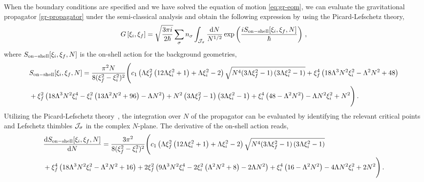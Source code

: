 \documentclass[superscriptaddress,aps,preprintnumbers,nofootinbib]{revtex4-2}
\begin{document}
When the boundary conditions are specified and we have solved the equation of motion \eqref{eq:gr-eom}, we can evaluate the gravitational propagator \eqref{gr-propagator} under the semi-classical analysis and obtain the following expression by using the Picard-Lefschetz theory, 
\begin{align}\label{G-Path-integral-gr}
G\left[\xi_{i},\xi_{f}\right]  
= \sqrt{\frac{3\pi i}{2\hbar}}\sum_\sigma n_\sigma \int_{\cal J_\sigma} \frac{\mathrm{d} N}{N^{1/2}} 
\exp \left(\frac{iS_{\rm on-shell}[\xi_{i},\xi_{f}, N]}{\hbar}\right)\,,  
\end{align}
where $S_{\rm on-shell}[\xi_{i},\xi_{f}, N]$ 
is the on-shell action for the background geometries,
\begin{align}\label{eq:on-shell-gr}
\begin{split}
&S_{\rm on-shell}[\xi_{i},\xi_{f},N]=\frac{\pi ^2 N}{8(\xi _f^2-\xi _i^2)^2}
\Biggl(c_1 \left(\Lambda  \xi _f^2 \left(12 \Lambda  \xi _i^2+1\right)+\Lambda  \xi _i^2-2\right) \sqrt{N^4(3 \Lambda  \xi _f^2-1) \left(3 \Lambda  \xi _i^2-1\right)}+\xi _f^4 \left(18 \Lambda ^3 N^2 \xi _i^2-\Lambda ^2 N^2+48\right)\\
&+\xi _f^2 \left(18 \Lambda ^3 N^2 \xi _i^4-\xi _i^2 \left(13 \Lambda ^2 N^2+96\right)-\Lambda  N^2\right)+N^2 \left(3 \Lambda  \xi _f^2-1\right) \left(3 \Lambda  \xi _i^2-1\right)+\xi _i^4 \left(48-\Lambda ^2 N^2\right)-\Lambda  N^2 \xi _i^2+N^2\Biggr)\,.
\end{split}
\end{align}
Utilizing the Picard-Lefschetz theory~\cite{Witten:2010cx}, the integration over $N$ of the propagator can be evaluated by identifying the relevant critical points and Lefschetz thimbles $\cal J_\sigma$ in the complex $N$-plane.
The derivative of the on-shell action reads,
\begin{align}
\begin{split}
&\frac{\mathrm{d} S_{\rm on-shell}[\xi_{i},\xi_{f}, N]}{\mathrm{d} N}=
\frac{3 \pi ^2}{8(\xi _f^2-\xi _i^2)^2}
\Biggl(
c_1 \left(\Lambda  \xi _f^2 \left(12 \Lambda  \xi _i^2+1\right)+\Lambda  \xi _i^2-2\right) \sqrt{N^4(3 \Lambda  \xi _f^2-1) \left(3 \Lambda  \xi _i^2-1\right)}\\
&+\xi _f^4 \left(18 \Lambda ^3 N^2 \xi_i^2-\Lambda ^2 N^2+16\right)+2 \xi _f^2 \left(9 \Lambda ^3 N^2 \xi _i^4-2 \xi _i^2 \left(\Lambda ^2 N^2+8\right)-2 \Lambda  N^2\right)+\xi _i^4 \left(16-\Lambda ^2 N^2\right)-4 \Lambda  N^2 \xi _i^2+2 N^2\Biggr)\,.
\end{split}
\end{align}
\end{document}
